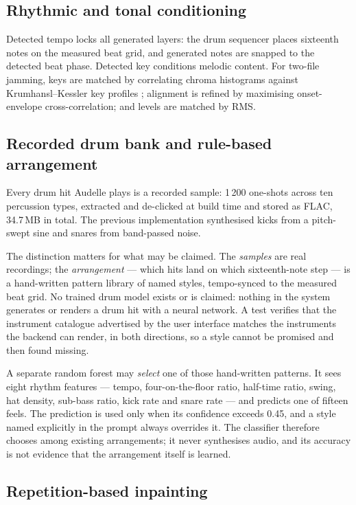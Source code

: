 \documentclass[conference]{IEEEtran}
\begin{document}
\subsection{Rhythmic and tonal conditioning}

Detected tempo locks all generated layers: the drum sequencer places sixteenth
notes on the measured beat grid, and generated notes are snapped to the
detected beat phase. Detected key conditions melodic content. For two-file
jamming, keys are matched by correlating chroma histograms against
Krumhansl--Kessler key profiles \cite{krumhansl1982perceived}; alignment is refined by maximising
onset-envelope cross-correlation; and levels are matched by RMS.

\subsection{Recorded drum bank and rule-based arrangement}

Every drum hit Audelle plays is a recorded sample: 1\,200 one-shots across ten
percussion types, extracted and de-clicked at build time and stored as FLAC,
34.7\,MB in total. The previous implementation synthesised kicks from a
pitch-swept sine and snares from band-passed noise.

The distinction matters for what may be claimed. The \emph{samples} are real
recordings; the \emph{arrangement} --- which hits land on which sixteenth-note
step --- is a hand-written pattern library of named styles, tempo-synced to
the measured beat grid. No trained drum model exists or is claimed: nothing in
the system generates or renders a drum hit with a neural network. A test
verifies that the instrument catalogue advertised by the user interface matches
the instruments the backend can render, in both directions, so a style cannot be
promised and then found missing.

A separate random forest may \emph{select} one of those hand-written patterns.
It sees eight rhythm features --- tempo, four-on-the-floor ratio, half-time
ratio, swing, hat density, sub-bass ratio, kick rate and snare rate --- and
predicts one of fifteen feels. The prediction is used only when its confidence
exceeds 0.45, and a style named explicitly in the prompt always overrides it.
The classifier therefore chooses among existing arrangements; it never
synthesises audio, and its accuracy is not evidence that the arrangement itself
is learned.

\subsection{Repetition-based inpainting}
\end{document}
